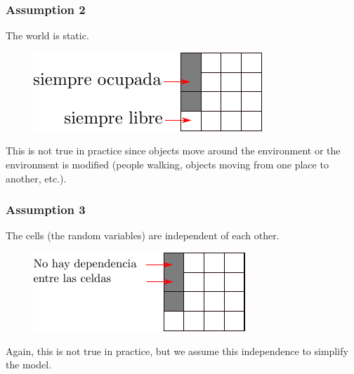     \begin{frame}
    \frametitle{Assumption 2}
    The world is static.
    
    \begin{figure}[!h]
    \includegraphics[width=0.7\columnwidth]{./images/grid_map_static_assumption.pdf}
    \end{figure}
    
    This is not true in practice since objects move around the environment or the environment is modified (people walking, objects moving from one place to another, etc.).
    
    \end{frame}
    
    \begin{frame}
    \frametitle{Assumption 3}
    The cells (the random variables) are independent of each other.
    
    \begin{figure}[!h]
    \includegraphics[width=0.7\columnwidth]{./images/grid_map_independency_assumption.pdf}
    \end{figure}
    
    Again, this is not true in practice, but we assume this independence to simplify the model.
    
\end{frame}

